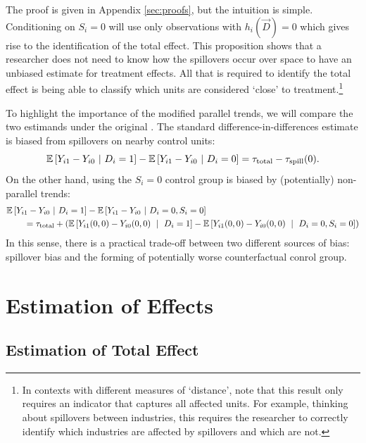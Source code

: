 \documentclass[11pt]{article}
\begin{document}
The proof is given in Appendix \ref{sec:proofs}, but the intuition is simple. Conditioning on $S_i = 0$ will use only observations with $h_i(\vec{D}) = 0$ which gives rise to the identification of the total effect. 
This proposition shows that a researcher does not need to know how the spillovers occur over space to have an unbiased estimate for treatment effects. All that is required to identify the total effect is being able to classify which units are considered `close' to treatment.\footnote{In contexts with different measures of `distance', note that this result only requires an indicator that captures all affected units. For example, thinking about spillovers between industries, this requires the researcher to correctly identify which industries are affected by spillovers and which are not.} 

\begin{remark}
  To highlight the importance of the modified parallel trends, we will compare the two estimands under the original . The standard difference-in-differences estimate is biased from spillovers on nearby control units: 
  $$
    \expec{Y_{i1} - Y_{i0} \ \vert \ D_i = 1 } - \expec{Y_{i1} - Y_{i0} \ \vert \ D_i = 0 } = \tau_{\text{total}} - \tau_{\text{spill}}(0).
  $$
  On the other hand, using the $S_i = 0$ control group is biased by (potentially) non-parallel trends:
  \begin{align*}
    &\mathbb{E}\left[Y_{i1} - Y_{i0} \ \vert \ D_i = 1\right] - \mathbb{E}\left[Y_{i1} - Y_{i0} \ \vert \ D_i = 0, S_{i} = 0\right] \\
    &\quad\quad= \tau_{\text{total}} + (\mathbb{E}\left[Y_{i1}(0, 0) - Y_{i0}(0,0) \ \mid \ D_i = 1\right] - \mathbb{E}\left[Y_{i1}(0, 0) - Y_{i0}(0,0) \ \mid \ D_i = 0, S_i = 0\right]) 
  \end{align*}
  In this sense, there is a practical trade-off between two different sources of bias: spillover bias and the forming of potentially worse counterfactual conrol group.
\end{remark}

\section{Estimation of Effects}\label{sec:estimation}

\subsection{Estimation of Total Effect}
\end{document}

